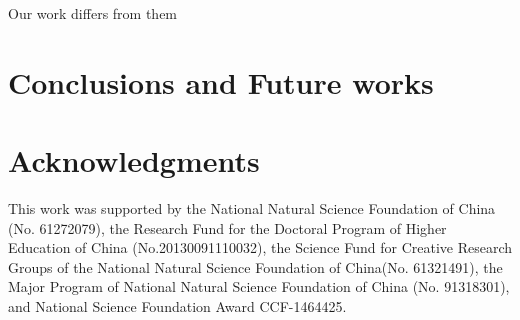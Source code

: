 \documentclass{sig-alternate-05-2015}
\begin{document}
Our work differs from them

\section{Conclusions and Future works}\label{sec:conclusion}


\section{Acknowledgments}
This work was supported by the National Natural Science Foundation of China (No. 61272079), the Research Fund for the Doctoral Program of Higher Education of China (No.20130091110032), the Science Fund for Creative Research Groups of the National Natural Science Foundation of China(No. 61321491), the Major Program of National Natural Science Foundation of China (No. 91318301), and National Science Foundation Award CCF-1464425.
\end{document}

